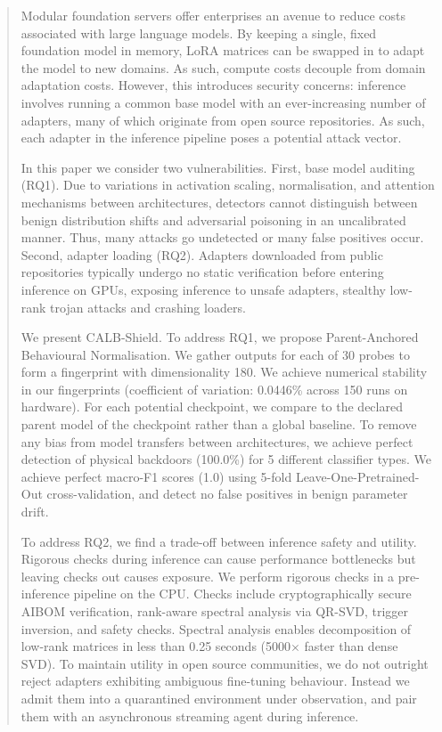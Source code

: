 \documentclass[conference]{IEEEtran}
\begin{document}
\begin{abstract}
Modular foundation servers offer enterprises an avenue to reduce costs associated with large language models. By keeping a single, fixed foundation model in memory, LoRA matrices can be swapped in to adapt the model to new domains. As such, compute costs decouple from domain adaptation costs. However, this introduces security concerns: inference involves running a common base model with an ever-increasing number of adapters, many of which originate from open source repositories. As such, each adapter in the inference pipeline poses a potential attack vector.

In this paper we consider two vulnerabilities. First, base model auditing (RQ1). Due to variations in activation scaling, normalisation, and attention mechanisms between architectures, detectors cannot distinguish between benign distribution shifts and adversarial poisoning in an uncalibrated manner. Thus, many attacks go undetected or many false positives occur. Second, adapter loading (RQ2). Adapters downloaded from public repositories typically undergo no static verification before entering inference on GPUs, exposing inference to unsafe adapters, stealthy low-rank trojan attacks and crashing loaders.

We present CALB-Shield. To address RQ1, we propose Parent-Anchored Behavioural Normalisation. We gather outputs for each of 30 probes to form a fingerprint with dimensionality 180. We achieve numerical stability in our fingerprints (coefficient of variation: 0.0446\% across 150 runs on hardware). For each potential checkpoint, we compare to the declared parent model of the checkpoint rather than a global baseline. To remove any bias from model transfers between architectures, we achieve perfect detection of physical backdoors (100.0\%) for 5 different classifier types. We achieve perfect macro-F1 scores (1.0) using 5-fold Leave-One-Pretrained-Out cross-validation, and detect no false positives in benign parameter drift.

To address RQ2, we find a trade-off between inference safety and utility. Rigorous checks during inference can cause performance bottlenecks but leaving checks out causes exposure. We perform rigorous checks in a pre-inference pipeline on the CPU. Checks include cryptographically secure AIBOM verification, rank-aware spectral analysis via QR-SVD, trigger inversion, and safety checks. Spectral analysis enables decomposition of low-rank matrices in less than 0.25 seconds (5000$\times$ faster than dense SVD). To maintain utility in open source communities, we do not outright reject adapters exhibiting ambiguous fine-tuning behaviour. Instead we admit them into a quarantined environment under observation, and pair them with an asynchronous streaming agent during inference.


\end{abstract}
\end{document}
